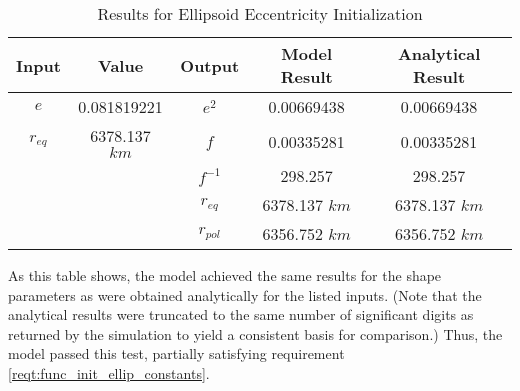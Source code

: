 \begin{description}
\begin{table}[ht]
\begin{center}
\begin{tabular}{|c|c|c|c|c|}\hline
 Input & Value & Output & Model Result & Analytical Result \\ \hline
 $e$ & 0.081819221 & $e^2$ & 0.00669438 & 0.00669438 \\ \hline
 $r_{eq}$ & 6378.137 $km$ & $f$ & 0.00335281 & 0.00335281 \\ \hline
   &   & $f^{-1}$ & 298.257 & 298.257 \\ \hline
   &   & $r_{eq}$ & 6378.137 $km$ & 6378.137 $km$ \\ \hline
   &   & $r_{pol}$ & 6356.752 $km$ & 6356.752 $km$ \\ \hline
\end{tabular}
\caption{Results for Ellipsoid Eccentricity Initialization}
\label{eellip_init_table}
\end{center}
\end{table}

As this table shows, the model achieved the same results for the shape
parameters as were obtained analytically for the listed inputs. (Note that the
analytical results were truncated to the same number of significant digits as
returned by the simulation to yield a consistent basis for comparison.) Thus,
the model passed this test, partially satisfying requirement
\mbox{\ref{reqt:func_init_ellip_constants}}.
\end{description}


